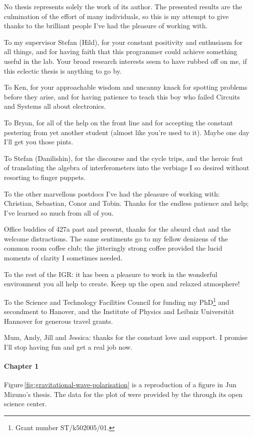 No thesis represents solely the work of its author. The presented results are the culmination of the effort of many individuals, so this is my attempt to give thanks to the brilliant people I've had the pleasure of working with.

\bigskip

To my supervisor Stefan (Hild), for your constant positivity and enthusiasm for all things, and for having faith that this programmer could achieve something useful in the lab. Your broad research interests seem to have rubbed off on me, if this eclectic thesis is anything to go by.

To Ken, for your approachable wisdom and uncanny knack for spotting problems before they arise, and for having patience to teach this boy who failed Circuits and Systems all about electronics.

To Bryan, for all of the help on the front line and for accepting the constant pestering from yet another student (almost like you're used to it). Maybe one day I'll get you those pints.

To Stefan (Danilishin), for the discourse and the cycle trips, and the heroic feat of translating the algebra of interferometers into the verbiage I so desired without resorting to finger puppets.

To the other marvellous postdocs I've had the pleasure of working with: Christian, Sebastian, Conor and Tobin. Thanks for the endless patience and help; I've learned so much from all of you.

Office buddies of 427a past and present, thanks for the absurd chat and the welcome distractions. The same sentiments go to my fellow denizens of the common room coffee club; the jitteringly strong coffee provided the lucid moments of clarity I sometimes needed.

To the rest of the IGR: it has been a pleasure to work in the wonderful environment you all help to create. Keep up the open and relaxed atmosphere!

To the Science and Technology Facilities Council for funding my PhD\footnote{Grant number ST/k502005/01.} and secondment to Hanover, and the Institute of Physics and Leibniz Universit\"{a}t Hannover for generous travel grants.

Mum, Andy, Jill and Jessica: thanks for the constant love and support. I promise I'll stop having fun and get a real job now.

\paragraph{Chapter 1}
Figure\,\ref{fig:gravitational-wave-polarisation} is a reproduction of a figure in Jun Mizuno's thesis. The data for the plot of \GWFIRSTEVENT{} were provided by the \LSC{} through its open science center.

